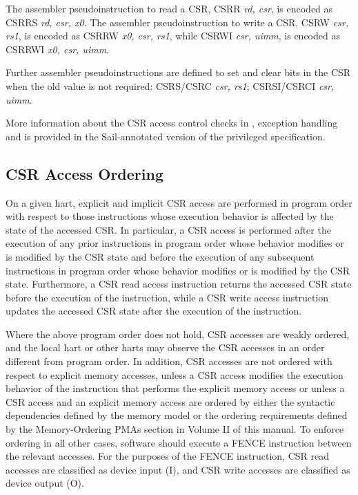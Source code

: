 The assembler pseudoinstruction to read a CSR, CSRR {\em rd, csr}, is
encoded as CSRRS {\em rd, csr, x0}.  The assembler pseudoinstruction
to write a CSR, CSRW {\em csr, rs1}, is encoded as CSRRW {\em x0, csr,
  rs1}, while CSRWI {\em csr, uimm}, is encoded as CSRRWI {\em x0,
  csr, uimm}.

Further assembler pseudoinstructions are defined to set and clear
bits in the CSR when the old value is not required: CSRS/CSRC {\em
  csr, rs1}; CSRSI/CSRCI {\em csr, uimm}.

\begin{formalspec}
  \sailfclCSRexecute
\end{formalspec}
\begin{formalcomment}
  More information about the CSR access control checks in
  , exception handling and
   is provided in the Sail-annotated
  version of the privileged specification.
\end{formalcomment}

\subsection*{CSR Access Ordering}

On a given hart, explicit and implicit CSR access are performed in program
order with respect to those instructions whose execution behavior is affected
by the state of the accessed CSR. In particular, a CSR access is performed
after the execution of any prior instructions in program order whose behavior
modifies or is modified by the CSR state and before the execution of any
subsequent instructions in program order whose behavior modifies or is modified
by the CSR state. Furthermore, a CSR read access instruction returns the
accessed CSR state before the execution of the instruction, while a CSR write
access instruction updates the accessed CSR state after the execution of the
instruction.

Where the above program order does not hold, CSR accesses are weakly ordered,
and the local hart or other harts may observe the CSR accesses in an order
different from program order. In addition, CSR accesses are not ordered with
respect to explicit memory accesses, unless a CSR access modifies the execution
behavior of the instruction that performs the explicit memory access or unless
a CSR access and an explicit memory access are ordered by either the syntactic
dependencies defined by the memory model or the ordering requirements defined
by the Memory-Ordering PMAs section in Volume II of this manual. To enforce
ordering in all other cases, software should execute a FENCE instruction
between the relevant accesses. For the purposes of the FENCE instruction, CSR
read accesses are classified as device input (I), and CSR write accesses are
classified as device output (O).

